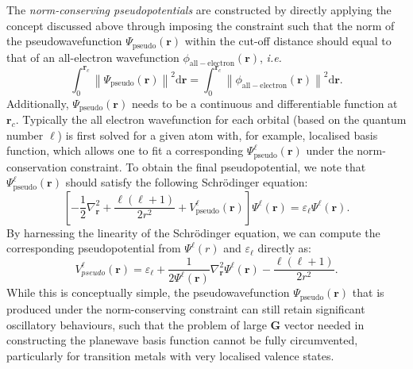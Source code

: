 The \emph{norm-conserving pseudopotentials}\cite{hamann1979norm,vanderbilt1985optimally,hamann2013optimized} are constructed by directly applying the concept discussed above through imposing the constraint such that the norm of the pseudowavefunction $\Psi_{\mathrm{pseudo}}(\bm{r})$ within the cut-off distance should equal to that of an all-electron wavefunction $\phi_{\mathrm{all-electron}}(\bm{r})$,  \emph{i.e.}
\begin{equation}\label{eq:norm_conserve_constraint}
    \int_0^{\bm{r}_c}\left\|\Psi_{\mathrm{pseudo}}(\bm{r})\right\|^2 \mbox{d}\bm{r} = \int_0^{\bm{r}_c}\left\|\phi_{\mathrm{all-electron}}(\bm{r})\right\|^2 \mbox{d}\bm{r}.
\end{equation}
Additionally, $\Psi_{\mathrm{pseudo}}(\bm{r})$ needs to be a continuous and differentiable function at $\bm{r}_c$. Typically the all electron wavefunction for each orbital (based on the quantum number $\ell$) is first solved for a given atom with, for example, localised basis function, which allows one to fit a corresponding $\Psi_{\mathrm{pseudo}}^{\ell}(\bm{r})$ under the norm-conservation constraint. To obtain the final pseudopotential, we note that $\Psi_{\mathrm{pseudo}}^{\ell}(\bm{r})$ should satisfy the following Schr\"{o}dinger equation:
\begin{equation*}
    \left[-\frac{1}{2}\nabla^2_{\bm{r}} +\frac{\ell(\ell+1)}{2r^2}+V_{\mathrm{pseudo}}^\ell(\bm{r})\right]\Psi^{\ell}(\bm{r})=\varepsilon_\ell  \Psi^{\ell}(\bm{r}).
\end{equation*}
By harnessing the linearity of the Schr\"{o}dinger equation, we can compute the corresponding pseudopotential from $\Psi^{\ell}(r)$ and $\varepsilon_\ell$ directly as:
\begin{equation*}
    \label{eq:norm_conserved_PP}
    V_{pseudo}^\ell (\bm{r}) = \varepsilon_\ell+\frac{1}{2\Psi^\ell (\bm{r})}\nabla^2_{\bm{r}} \Psi^{\ell}(\bm{r})-\frac{\ell(\ell+1)}{2r^2}.
\end{equation*}
While this is conceptually simple, the pseudowavefunction $\Psi_{\mathrm{pseudo}}(\bm{r})$ that is produced under the norm-conserving constraint can still retain significant oscillatory behaviours, such that the problem of large $\bm{G}$ vector needed in constructing the  planewave basis function cannot be fully circumvented, particularly for transition metals with very localised valence states.

